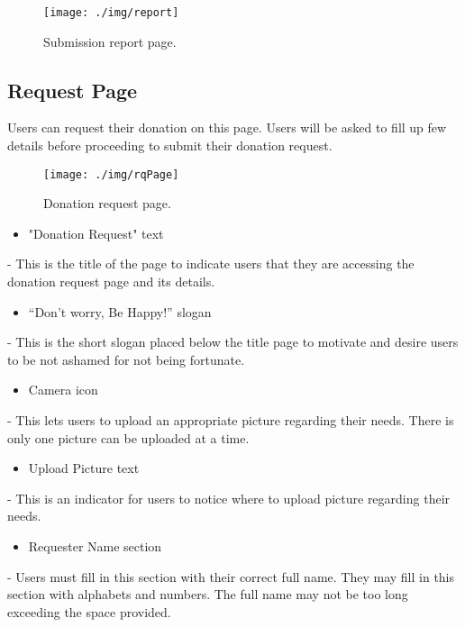 \documentclass[conference]{IEEEtran}
\begin{document}
\begin{figure}[h!]
\texttt{[image: ./img/report]}
\centering
\caption{Submission report page.}
\end{figure}

\subsection{Request Page}

Users can request their donation on this page. Users will be asked to fill up few details before proceeding to submit their donation request.

\begin{figure}[h!]
\texttt{[image: ./img/rqPage]}
\centering
\caption{Donation request page.}
\end{figure}

\begin{itemize}
\item "Donation Request" text
\end{itemize}

- This is the title of the page to indicate users that they are accessing the donation request page and its details.\\

\begin{itemize}
\item “Don't worry, Be Happy!” slogan
\end{itemize}
- This is the short slogan placed below the title page to motivate and desire users to be not ashamed for not being fortunate. \\

\begin{itemize}
\item Camera icon
\end{itemize}
- This lets users to upload an appropriate picture regarding their needs. There is only one picture can be uploaded at a time.\\

\begin{itemize}
\item Upload Picture text
\end{itemize}
- This is an indicator for users to notice where to upload picture regarding their needs. \\

\begin{itemize}
\item Requester Name section
\end{itemize}
-  Users must fill in this section with their correct full name. They may fill in this section with alphabets and numbers. The full name may not be too long exceeding the space provided.\\
\end{document}
